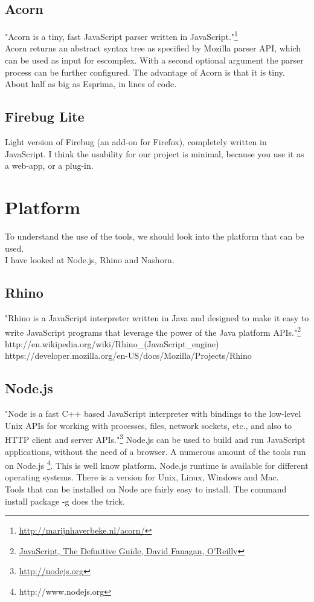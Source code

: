 \documentclass{article}
\begin{document}
\subsection{Acorn}
"Acorn is a tiny, fast JavaScript parser written in JavaScript."\footnote{\url{http://marijnhaverbeke.nl/acorn/}}\\
Acorn returns an abstract syntax tree as specified by Mozilla parser API, which can be used as input for escomplex.
With a second optional argument the parser process can be further configured.
The advantage of Acorn is that it is tiny. About half as big as Esprima, in lines of code.

\subsection {Firebug Lite}
Light version of Firebug (an add-on for Firefox), completely written in JavaScript.
I think the usability for our project is minimal, because you use it as a web-app, or a plug-in.

\section{Platform}
To understand the use of the tools, we should look into the platform that can be used.\\
I have looked at Node.js, Rhino and Nashorn.

\subsection{Rhino}
"Rhino is a JavaScript interpreter written in Java and designed to make it easy to write JavaScript programs 
that leverage the power of the Java platform APIs."\footnote{\url{JavaScript, The Definitive Guide, David Fanagan, O'Reilly}}\newline
http://en.wikipedia.org/wiki/Rhino\_(JavaScript\_engine)
https://developer.mozilla.org/en-US/docs/Mozilla/Projects/Rhino

\subsection{Node.js}
"Node is a fast C++ based JavaScript interpreter with bindings to the low-level 
Unix APIs for working with processes, files, network sockets, etc., and also to 
HTTP client and server APIs."\footnote{\url{http://nodejs.org}}
Node.js can be used to build and run JavaScript applications, without the need of a browser.
A numerous amount of the tools run on Node.js \footnote{http://www.nodejs.org}. This is well know platform.
Node.js runtime is available for different operating systems.
There is a version for Unix, Linux, Windows and Mac.\\
Tools that can be installed on Node are fairly easy to install. The command install package -g does the trick.\\
\end{document}
